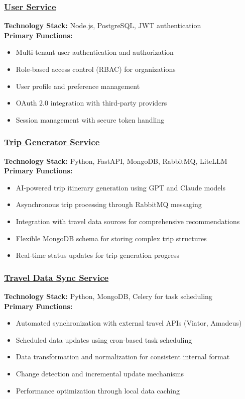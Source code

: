 \subsubsection*{\underline{User Service}}
\textbf{Technology Stack:} Node.js, PostgreSQL, JWT authentication\\
\textbf{Primary Functions:}
\begin{itemize}
    \item Multi-tenant user authentication and authorization
    \item Role-based access control (RBAC) for organizations
    \item User profile and preference management
    \item OAuth 2.0 integration with third-party providers
    \item Session management with secure token handling
\end{itemize}

\subsubsection*{\underline{Trip Generator Service}}
\textbf{Technology Stack:} Python, FastAPI, MongoDB, RabbitMQ, LiteLLM\\
\textbf{Primary Functions:}
\begin{itemize}
    \item AI-powered trip itinerary generation using GPT and Claude models
    \item Asynchronous trip processing through RabbitMQ messaging
    \item Integration with travel data sources for comprehensive recommendations
    \item Flexible MongoDB schema for storing complex trip structures
    \item Real-time status updates for trip generation progress
\end{itemize}

\subsubsection*{\underline{Travel Data Sync Service}}
\textbf{Technology Stack:} Python, MongoDB, Celery for task scheduling\\
\textbf{Primary Functions:}
\begin{itemize}
    \item Automated synchronization with external travel APIs (Viator, Amadeus)
    \item Scheduled data updates using cron-based task scheduling
    \item Data transformation and normalization for consistent internal format
    \item Change detection and incremental update mechanisms
    \item Performance optimization through local data caching
\end{itemize}

